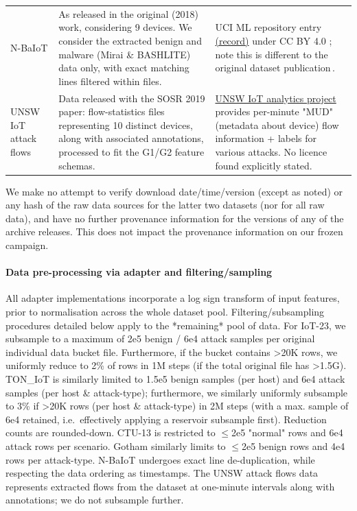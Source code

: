 {\begin{longtable}{>{\raggedright\arraybackslash}p{}>{\raggedright\arraybackslash}p{}>{\raggedright\arraybackslash}p{}}
N-BaIoT & As released in the original (2018) work, considering 9 devices. We consider the extracted benign and malware (Mirai \& BASHLITE) data only, with exact matching lines filtered within files. & UCI ML repository entry \href{https://doi.org/10.24432/C5RC8J}{(record)} under CC BY 4.0 \cite{nbaiotdata2018}; note this is different to the original dataset publication\,\cite{nbaiot2018}.\\
UNSW IoT attack flows & Data released with the SOSR 2019 paper: flow-statistics files representing 10 distinct devices, along with associated annotations, processed to fit the G1/G2 feature schemas. & \href{https://iotanalytics.unsw.edu.au/attack-data.html}{UNSW IoT analytics project} provides per-minute "MUD" (metadata about device) flow information + labels for various attacks. No licence found explicitly stated.\\
\end{longtable}} 

We make no attempt to verify download date/time/version (except as noted) or any hash of the raw data sources for the latter two datasets (nor for all raw data), and have no further provenance information for the versions of any of the archive releases. This does not impact the provenance information on our frozen campaign.

\paragraph{Data pre-processing via adapter and filtering/sampling} 
All adapter implementations incorporate a log sign transform of input features, prior to normalisation across the whole dataset pool. Filtering/subsampling procedures detailed below apply to the *remaining* pool of data. For IoT-23, we subsample to a maximum of 2e5 benign / 6e4 attack samples per original individual data bucket file. Furthermore, if the bucket contains >20K rows, we uniformly reduce to 2\% of rows in 1M steps (if the total original file has >1.5G). TON\_IoT is similarly limited to 1.5e5 benign samples (per host) and 6e4 attack samples (per host \& attack-type); furthermore, we similarly uniformly subsample to 3\% if >20K rows (per host \& attack-type) in 2M steps (with a max. sample of 6e4 retained, i.e.\ effectively applying a reservoir subsample first). Reduction counts are rounded-down. CTU-13 is restricted to $\leq$2e5 "normal" rows and 6e4 attack rows per scenario. Gotham similarly limits to $\leq$2e5 benign rows and 4e4 rows per attack-type. N-BaIoT undergoes exact line de-duplication, while respecting the data ordering as timestamps. The UNSW attack flows data represents extracted flows from the dataset at one-minute intervals along with annotations; we do not subsample further.
